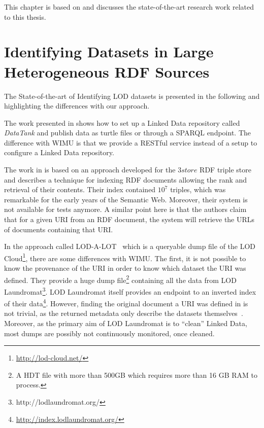 This chapter is based on \cite{valdestilhasdbpediasameas, valdestilhas2017cedal, valdestilhas2018my, ValdestilhasKcap, valdestilhas2017high} and discusses the state-of-the-art research work related to this thesis.

\section{Identifying Datasets in Large Heterogeneous RDF Sources}
The State-of-the-art of Identifying LOD datasets is presented in the following and highlighting the differences with our approach.

The work presented in \cite{colpaert2014painless} shows how to set up a Linked Data repository called \emph{DataTank} and publish data as turtle files or through a SPARQL endpoint.
The difference with WIMU is that we provide a RESTful service instead of a setup to configure a Linked Data repository.

The work in \cite{harris2004semindex} is based on an approach developed for the $3store$ RDF triple store and describes a technique for indexing RDF documents allowing the rank and retrieval of their contents. 
Their index contained $10^7$ triples, which was remarkable for the early years of the Semantic Web.
Moreover, their system is not available for tests anymore.
A similar point here is that the authors claim that for a given URI from an RDF document, the system will retrieve the URLs of documents containing that URI.

In the approach called LOD-A-LOT~\cite{fernandez2017lod} which is a queryable dump file of the LOD Cloud\footnote{\url{http://lod-cloud.net/}}, there are some differences with WIMU.
The first, it is not possible to know the provenance of the URI in order to know which dataset the URI was defined. 
They provide a huge dump file\footnote{A HDT file with more than 500GB which requires more than 16 GB RAM to process.} containing all the data from LOD Laundromat\footnote{http://lodlaundromat.org/}.
LOD Laundromat itself provides an endpoint to an inverted index of their data\footnote{\url{http://index.lodlaundromat.org/}}.
However, finding the original document a URI was defined in is not trivial, as the returned metadata only describe the datasets themselves~\cite{beek2014lod}.
Moreover, as the primary aim of LOD Laundromat is to ``clean'' Linked Data, most dumps are possibly not continuously monitored, once cleaned.

